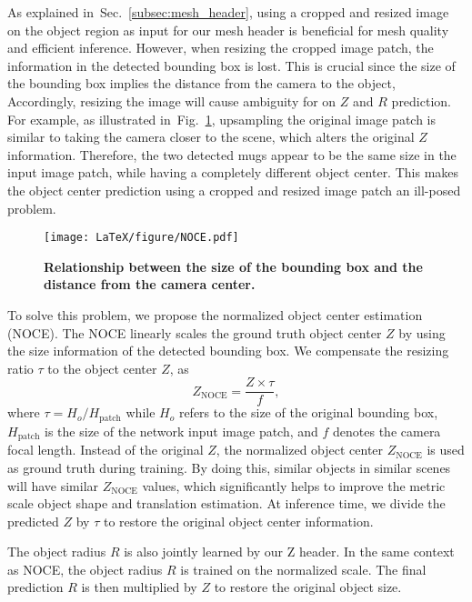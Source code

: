 \documentclass[letterpaper, 10 pt, journal, twoside]{IEEEtran}
\newcommand{\CH}[1]{{#1}}
\newcommand{\figref}[1]{Fig.~\ref{#1}}
\newcommand{\secref}[1]{Sec.~\ref{#1}}
\begin{document}
As explained in~\secref{subsec:mesh_header}, using a cropped and resized image on the object region as input for our mesh header is beneficial for mesh quality and efficient inference.
However, when resizing the cropped image patch, the information in the detected bounding box is lost.
This is crucial since the size of the bounding box implies the distance from the camera to the object, Accordingly, resizing the image will cause ambiguity for on $Z$ and $R$ prediction.
For example, as illustrated in~\figref{fig:NOCE}, upsampling the original image patch is similar to taking the camera closer to the scene, which alters the original $Z$ information.
Therefore, the two detected mugs appear to be the same size in the input image patch, while having a completely different object center.
This makes the object center prediction using a cropped and resized image patch an ill-posed problem.


\begin{figure}
\begin{center}
\texttt{[image: LaTeX/figure/NOCE.pdf]} \\
\caption{\textbf{Relationship between the size of the bounding box and the distance from the camera center.}
}
\label{fig:NOCE}
\end{center}
\vspace{-5mm}
\end{figure} 

To solve this problem, we propose the normalized object center estimation (NOCE).
The NOCE linearly scales the ground truth object center $Z$ by using the size information of the detected bounding box.
We compensate the resizing ratio $\tau$ to the object center $Z$, as
\begin{equation}
    Z_{\text{NOCE}} = \frac{Z \times \tau}{\CH{f}},
\end{equation}
where $\tau = H_o/H_{\text{patch}}$ while $H_o$ refers to the size of the original bounding box, $H_{\text{patch}}$ is the size of the network input image patch, and \CH{$f$ denotes the camera focal length}.
Instead of the original $Z$, the normalized object center $Z_{\text{NOCE}}$ is used as ground truth during training.
By doing this, similar objects in similar scenes will have similar $Z_{\text{NOCE}}$ values, which significantly helps to improve the metric scale object shape and translation estimation.
At inference time, we divide the predicted $Z$ by $\tau$ to restore the original object center information.


The object radius $R$ is also jointly learned by our Z header.
In the same context as NOCE, the object radius $R$ is trained on the normalized scale.
The final prediction $R$ is then multiplied by $Z$ to restore the original object size.
\end{document}
